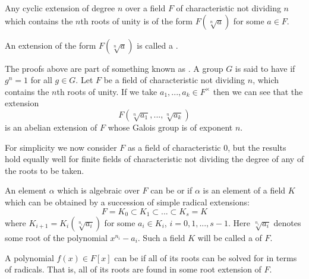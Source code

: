 \documentclass[12pt, a4paper, oneside, openright, titlepage]{book}
\begin{document}
\begin{prop}\label{prop:cyclicimpliesrad}
    Any cyclic extension of degree $n$ over a field $F$ of characteristic not dividing $n$ which contains the $n$th roots of unity is of the form $F(\sqrt[n]{a})$ for some $a \in F$.
\end{prop}

An extension of the form $F(\sqrt[n]{a})$ is called a . 

\begin{rmk}
    The proofs above are part of something known as . A group $G$ is said to have  if $g^n = 1$ for all $g \in G$. Let $F$ be a field of characteristic not dividing $n$, which contains the $n$th roots of unity. If we take $a_1,...,a_k \in F^{\times}$ then we can see that the extension \begin{equation*}
        F(\sqrt[n]{a_1},...,\sqrt[n]{a_k})
    \end{equation*}
    is an abelian extension of $F$ whose Galois group is of exponent $n$.
\end{rmk}


For simplicity we now consider $F$ as a field of characteristic $0$, but the results hold equally well for finite fields of characteristic not dividing the degree of any of the roots to be taken.

\begin{defn}
    An element $\alpha$ which is algebraic over $F$ can be  or  if $\alpha$ is an element of a field $K$ which can be obtained by a succession of simple radical extensions:\begin{equation*}
        F = K_0 \subset K_1 \subset ... \subset K_s = K
    \end{equation*}
    where $K_{i+1} = K_i(\sqrt[n_i]{a_i})$ for some $a_i \in K_i$, $i = 0,1,...,s-1$. Here $\sqrt[n_i]{a_i}$ denotes some root of the polynomial $x^{n_i}-a_i$. Such a field $K$ will be called a  of $F$.
\end{defn}

\begin{defn}
    A polynomial $f(x) \in F[x]$ can be  if all of its roots can be solved for in terms of radicals. That is, all of its roots are found in some root extension of $F$.
\end{defn}
\end{document}
